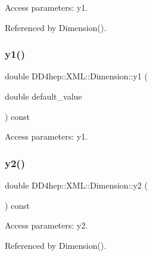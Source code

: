 Access parameters\+: y1. 



Referenced by Dimension().

\hypertarget{struct_d_d4hep_1_1_x_m_l_1_1_dimension_a3d65ac8382a31ccb66264c785022d4da}{}\label{struct_d_d4hep_1_1_x_m_l_1_1_dimension_a3d65ac8382a31ccb66264c785022d4da} 
\subsubsection{\texorpdfstring{y1()}{y1()}\hspace{0.1cm}{\footnotesize\ttfamily [2/2]}}
{\footnotesize\ttfamily double D\+D4hep\+::\+X\+M\+L\+::\+Dimension\+::y1 (\begin{DoxyParamCaption}\item[{double}]{default\+\_\+value }\end{DoxyParamCaption}) const}



Access parameters\+: y1. 

\hypertarget{struct_d_d4hep_1_1_x_m_l_1_1_dimension_abef27bfc3bcb2795c63ba10894f970e7}{}\label{struct_d_d4hep_1_1_x_m_l_1_1_dimension_abef27bfc3bcb2795c63ba10894f970e7} 
\subsubsection{\texorpdfstring{y2()}{y2()}\hspace{0.1cm}{\footnotesize\ttfamily [1/2]}}
{\footnotesize\ttfamily double D\+D4hep\+::\+X\+M\+L\+::\+Dimension\+::y2 (\begin{DoxyParamCaption}{ }\end{DoxyParamCaption}) const}



Access parameters\+: y2. 



Referenced by Dimension().

\hypertarget{struct_d_d4hep_1_1_x_m_l_1_1_dimension_a1532c8a10f1c2b33e14cacbdec3e919e}{}\label{struct_d_d4hep_1_1_x_m_l_1_1_dimension_a1532c8a10f1c2b33e14cacbdec3e919e} 
